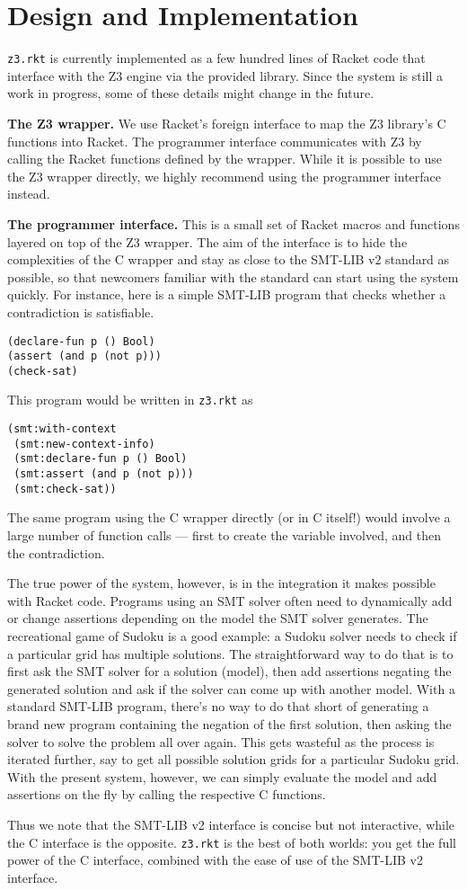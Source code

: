 \section{Design and Implementation}

\texttt{z3.rkt} is currently implemented as a few hundred lines of Racket code
that interface with the Z3 engine via the provided library. Since the system is
still a work in progress, some of these details might change in the future.

\textbf{The Z3 wrapper.} We use Racket's foreign interface \cite{racket/foreign}
to map the Z3 library's C functions into Racket. The programmer interface
communicates with Z3 by calling the Racket functions defined by the
wrapper. While it is possible to use the Z3 wrapper directly, we highly
recommend using the programmer interface instead.

\textbf{The programmer interface.} This is a small set of Racket macros and
functions layered on top of the Z3 wrapper. The aim of the interface is to hide
the complexities of the C wrapper and stay as close to the SMT-LIB v2 standard
\cite{smtlib2:10} as possible, so that newcomers familiar with the standard can
start using the system quickly. For instance, here is a simple SMT-LIB program
that checks whether a contradiction is satisfiable.

\begin{verbatim}
(declare-fun p () Bool)
(assert (and p (not p)))
(check-sat)
\end{verbatim}

This program would be written in \texttt{z3.rkt} as

\begin{verbatim}
(smt:with-context
 (smt:new-context-info)
 (smt:declare-fun p () Bool)
 (smt:assert (and p (not p)))
 (smt:check-sat))
\end{verbatim}

The same program using the C wrapper directly (or in C itself!) would involve a
large number of function calls --- first to create the variable involved, and
then the contradiction.

The true power of the system, however, is in the integration it makes possible
with Racket code. Programs using an SMT solver often need to dynamically add or
change assertions depending on the model the SMT solver generates. The
recreational game of Sudoku is a good example: a Sudoku solver needs to check if
a particular grid has multiple solutions. The straightforward way to do that is
to first ask the SMT solver for a solution (model), then add assertions negating
the generated solution and ask if the solver can come up with another
model. With a standard SMT-LIB program, there's no way to do that short of
generating a brand new program containing the negation of the first solution,
then asking the solver to solve the problem all over again. This gets wasteful
as the process is iterated further, say to get all possible solution grids for a
particular Sudoku grid. With the present system, however, we can simply evaluate
the model and add assertions on the fly by calling the respective C functions.

Thus we note that the SMT-LIB v2 interface is concise but not interactive, while
the C interface is the opposite. \texttt{z3.rkt} is the best of both worlds: you
get the full power of the C interface, combined with the ease of use of the
SMT-LIB v2 interface.
